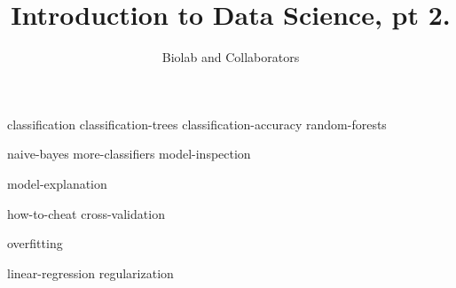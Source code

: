 \documentclass[symmetric, justified, a4paper]{tufte-book}
\title{Introduction to Data Science, pt 2.}
\author[Biolab and Collaborators]{Biolab and Collaborators}
\begin{document}
\frontmatter

\maketitle



\tableofcontents

\mainmatter







% 



{classification}
{classification-trees}
{classification-accuracy}
{random-forests}

{naive-bayes}
{more-classifiers}
{model-inspection}

{model-explanation}

{how-to-cheat}
{cross-validation}

{overfitting}


{linear-regression}
{regularization}

\backmatter



\end{document}
